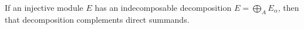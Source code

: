 If an injective module $E$ has an indecomposable decomposition $E = \bigoplus_A E_\alpha$, then that decomposition complements direct summands.
